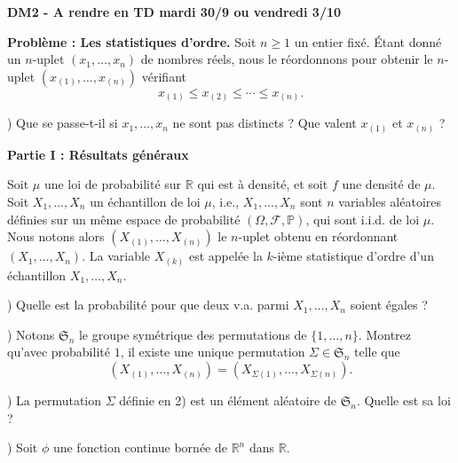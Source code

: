 \documentclass[12pt,a4paper]{article}
\begin{document}
\begin{center}
\textbf{DM2 - A rendre en TD mardi 30/9 ou vendredi 3/10}
\end{center}

\bigskip

\noindent
\textbf{Problème : Les statistiques d'ordre.} Soit $n \geq 1$ un entier fixé. Étant donné un $n$-uplet $(x_1, \dots, x_n)$ de nombres réels, nous le réordonnons pour obtenir le $n$-uplet $(x_{(1)}, \dots, x_{(n)})$ vérifiant
\[
x_{(1)} \leq x_{(2)} \leq \cdots \leq x_{(n)}.
\]

) Que se passe-t-il si $x_1, \dots, x_n$ ne sont pas distincts ? Que valent $x_{(1)}$ et $x_{(n)}$ ?

\bigskip

\noindent
\textbf{Partie I : Résultats généraux}

\medskip

\noindent
Soit $\mu$ une loi de probabilité sur $\mathbb{R}$ qui est à densité, et soit $f$ une densité de $\mu$. Soit $X_1, \dots, X_n$ un échantillon de loi $\mu$, i.e., $X_1, \dots, X_n$ sont $n$ variables aléatoires définies sur un même espace de probabilité $(\Omega, \mathscr{F}, \mathbb{P})$, qui sont i.i.d. de loi $\mu$. Nous notons alors $(X_{(1)}, \dots, X_{(n)})$ le $n$-uplet obtenu en réordonnant $(X_1, \dots, X_n)$. La variable $X_{(k)}$ est appelée la $k$-ième statistique d’ordre d’un échantillon $X_1, \dots, X_n$.

\medskip

) Quelle est la probabilité pour que deux v.a. parmi $X_1, \dots, X_n$ soient égales ?

\medskip

) Notons $\mathfrak{S}_n$ le groupe symétrique des permutations de $\{1, \dots, n\}$. Montrez qu’avec probabilité $1$, il existe une unique permutation $\Sigma \in \mathfrak{S}_n$ telle que
\[
(X_{(1)}, \dots, X_{(n)}) = (X_{\Sigma(1)}, \dots, X_{\Sigma(n)}).
\]

\medskip

) La permutation $\Sigma$ définie en 2) est un élément aléatoire de $\mathfrak{S}_n$. Quelle est sa loi ?

\medskip

) Soit $\phi$ une fonction continue bornée de $\mathbb{R}^n$ dans $\mathbb{R}$.
\end{document}
